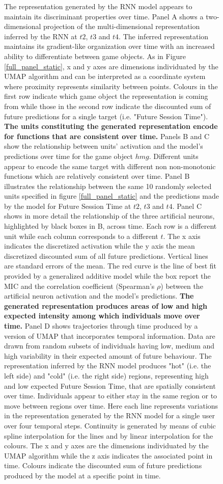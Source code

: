 \begin{figure}[ht]
\caption[\textbf{Lower dimensional representation of the evolution of the latent states generated by the RNN architecture}]{The representation generated by the RNN model appears to maintain its discriminant properties over time. Panel A shows a two-dimensional projection of the multi-dimensional representation inferred by the RNN at $t2$, $t3$ and $t4$. The inferred representation maintains its gradient-like organization over time with an increased ability to differentiate between game objects. As in Figure \ref{full_panel_static}, x and y axes are dimensions individuated by the UMAP algorithm and can be interpreted as a coordinate system where proximity represents similarity between points. Colours in the first row indicate which game object the representation is coming from while those in the second row indicate the discounted sum of future predictions for a single target (i.e. "Future Session Time"). \textbf{The units constituting the generated representation encode for functions that are consistent over time.} Panels B and C show the relationship between units' activation and the model's predictions over time for the game object $hmg$. Different units appear to encode the same target with different non non-monotonic functions which are relatively consistent over time. Panel B illustrates the relationship between the same 10 randomly selected units specified in figure \ref{full_panel_static} and the predictions made by the model for Future Session Time at $t2$, $t3$ and $t4$. Panel C shows in more detail the relationship of the three artificial neurons, highlighted by black boxes in B, across time. Each row is a different unit while each column corresponds to a different $t$. The x axis indicates the discretized activation while the y axis the mean discretized discounted sum of all future predictions. Vertical lines are standard errors of the mean. The red curve is the line of best fit provided by a generalized additive model \cite{serven2018} while the box report the MIC and the correlation coefficient (Spearman's $\rho$) between the artificial neuron activation and the model's predictions. \textbf{The generated representation produces areas of low and high expected intensity among which individuals move over time.} Panel D shows trajectories through time produced by a version of UMAP that incorporates temporal information. Data are drawn from random subsets of individuals having low, medium and high variability in their expected amount of future behaviour. The representation inferred by the RNN model produces "hot" (i.e. the left side) and "cold" (i.e. the right side) regions, representing high and low expected Future Session Time, that are spatially consistent over time. Individuals appear to either stay in the same region or to move between regions over time. Here each line represents variations in the representation generated by the RNN model for a single user over four temporal steps. Continuity is generated by means of cubic spline interpolation for the lines and by linear interpolation for the colours. The x and y axes are the dimensions individuated by the UMAP algorithm while the z axis indicates the associated point in time. Colours indicate the discounted sum of future predictions produced by the model at a specific point in time.}

\end{figure}
